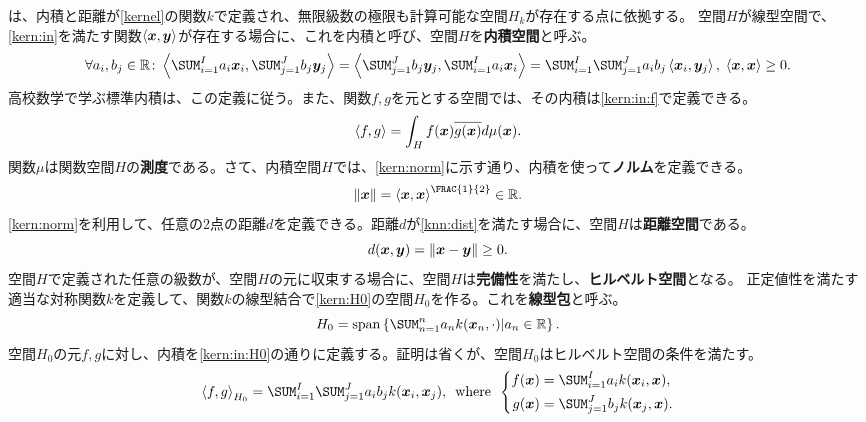 \documentclass[10pt,a4paper]{book}
\begin{document}
は、内積と距離が\eqref{kernel}の関数$k$で定義され、無限級数の極限も計算可能な空間$H_k$が存在する点に依拠する。
空間$H$が線型空間で、\eqref{kern:in}を満たす関数$\left\langle \bm{x},\bm{y}\right\rangle$が存在する場合に、これを内積と呼び、空間$H$を\textbf{内積空間}と呼ぶ。
%
\begin{equation}
\label{eq:kern:in}
\forall a_i,b_j \in \mathbb{R} \colon
\iprod{\sum_{i=1}^I a_i \bm{x}_i}{\sum_{j=1}^J b_j \bm{y}_j} =
\iprod{\sum_{j=1}^J b_j \bm{y}_j}{\sum_{i=1}^I a_i \bm{x}_i} =
\sum_{i=1}^I \sum_{j=1}^J a_i b_j \iprod{\bm{x}_i}{\bm{y}_j},\esp
\iprod{\bm{x}}{\bm{x}} \geq 0.
\end{equation}
%
高校数学で学ぶ標準内積は、この定義に従う。また、関数$f,g$を元とする空間では、その内積は\eqref{kern:in:f}で定義できる。
%
\begin{equation}
\label{eq:kern:in:f}
\left\langle f,g\right\rangle = \int_H f(\bm{x}) \overline{g(\bm{x})} d\mu(\bm{x}).
\end{equation}
%
関数$\mu$は関数空間$H$の\textbf{測度}である。さて、内積空間$H$では、\eqref{kern:norm}に示す通り、内積を使って\textbf{ノルム}を定義できる。
%
\begin{equation}
\label{eq:kern:norm}
\norm{\bm{x}} = \iprod{\bm{x}}{\bm{x}}^{\FRAC{1}{2}} \in \mathbb{R}.
\end{equation}
%
\eqref{kern:norm}を利用して、任意の2点の距離$d$を定義できる。距離$d$が\eqref{knn:dist}を満たす場合に、空間$H$は\textbf{距離空間}である。
%
\begin{equation}
\label{eq:kern:dist}
d(\bm{x},\bm{y}) = \norm{\bm{x}-\bm{y}} \geq 0.
\end{equation}
%
空間$H$で定義された任意の級数が、空間$H$の元に収束する場合に、空間$H$は\textbf{完備性}を満たし、\textbf{ヒルベルト空間}となる。
正定値性を満たす適当な対称関数$k$を定義して、関数$k$の線型結合で\eqref{kern:H0}の空間$H_0$を作る。これを\textbf{線型包}と呼ぶ。
%
\begin{equation}
\label{eq:kern:H0}
H_0 = \mathrm{span}\seq{\sum_{n=1}^n a_n k(\bm{x}_n,\cdot)|a_n \in \mathbb{R}}.
\end{equation}
%
空間$H_0$の元$f,g$に対し、内積を\eqref{kern:in:H0}の通りに定義する。証明は省くが、空間$H_0$はヒルベルト空間の条件を満たす。
%
\begin{equation}
\label{eq:kern:in:H0}
\iprod{f}{g}_{H_0} = \sum_{i=1}^I \sum_{j=1}^J a_i b_j k(\bm{x}_i,\bm{x}_j),
\where
\left\{
\begin{aligned}
f(\bm{x}) &= \sum_{i=1}^I a_i k(\bm{x}_i,\bm{x}),\\
g(\bm{x}) &= \sum_{j=1}^J b_j k(\bm{x}_j,\bm{x}).
\end{aligned}
\right.
\end{equation}
\end{document}

